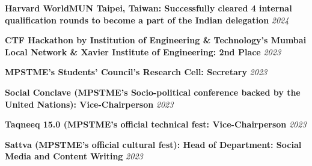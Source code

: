 \vspace{-3mm} 

\begin{cventries}
	

\customcventry
	{\textbf{Harvard WorldMUN Taipei, Taiwan: Successfully cleared 4 internal qualification rounds to become a part of the Indian delegation}} %
	{} %
	{}%
	{\textit{2024}} %
	{}
\vspace{-3.5mm} 

\customcventry
	{\textbf{CTF Hackathon by Institution of Engineering \& Technology's Mumbai Local Network \& Xavier Institute of Engineering: 2nd Place}} %
	{} %
	{}%
	{\textit{2023}} %
	{}
\vspace{-3.5mm} 

\customcventry
	{\textbf{MPSTME's Students' Council's Research Cell: Secretary}} %
	{} %
	{}%
	{\textit{2023}} %
	{}
\vspace{-3.5mm} 

 \customcventry
	{\textbf{Social Conclave (MPSTME's Socio-political conference backed by the United Nations): Vice-Chairperson}} %
	{} %
	{}%
	{\textit{2023}} %
	{}
\vspace{-3.5mm} 

 \customcventry
	{\textbf{Taqneeq 15.0 (MPSTME’s official technical fest: Vice-Chairperson}} %
	{} %
	{}%
	{\textit{2023}} %
	{}
\vspace{-3.5mm} 

 \customcventry
	{\textbf{Sattva (MPSTME’s official cultural fest): Head of Department: Social Media and Content Writing}} %
	{} %
	{}%
	{\textit{2023}} %
	{}
\vspace{-3.5mm} 




\vspace{-6.0mm}  

 
\end{cventries}
